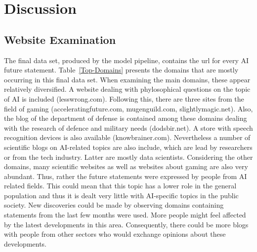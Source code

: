 \section{Discussion}

\subsection{Website Examination}

The final data set, produced by the model pipeline, contains the url for every AI future statement.
Table~\ref{Top-Domains} presents the domains that are mostly occurring in this final data set.
When examining the main domains, these appear relatively  diversified.
A website dealing with phylosophical questions on the topic of AI is included (lesswrong.com).
Following this, there are three sites from the field of gaming (acceleratingfuture.com, mugenguild.com, slightlymagic.net).
Also, the blog of the department of defense is contained among these domains dealing with the research of defence and military needs (dodsbir.net).
A store with speech recognition devices is also available (knowbrainer.com).
Nevertheless a number of scientific blogs on AI-related topics are also include, which are lead by researchers or from the tech industry.
Latter are mostly data scientists.
Considering the other domains, many scientific websites as well as websites about gaming are also very abundant.
Thus, rather the future statements were expressed by people from AI related fields.
This could mean that this topic has a lower role in the general population and thus it is dealt very little with AI-specific topics in the public society.
New discoveries could be made by observing domains containing statements from the last few months were used.
More people might feel affected by the latest developments in this area.
Consequently, there could be more blogs with people from other sectors who would exchange opinions about these developments.
